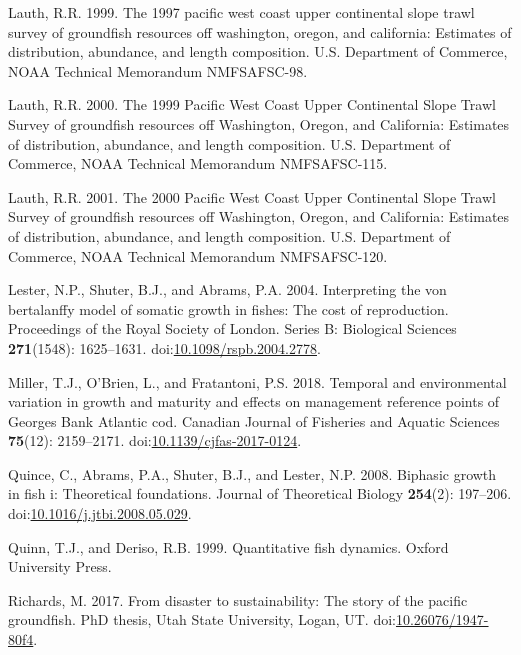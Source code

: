 \documentclass[
]{article}
\newlength{\cslhangindent}
\newlength{\cslentryspacingunit} %
\newenvironment{CSLReferences}[2] %
 {%
  \setlength{\parindent}{0pt}
  \ifodd #1
  \let\oldpar\par
  \def\par{\hangindent=\cslhangindent\oldpar}
  \fi
  \setlength{\parskip}{#2\cslentryspacingunit}
 }%
 {}
\begin{document}
\begin{CSLReferences}{1}{0}
\leavevmode{}%
Lauth, R.R. 1999. The 1997 pacific west coast upper continental slope
trawl survey of groundfish resources off washington, oregon, and
california: Estimates of distribution, abundance, and length
composition. {U.S. Department of Commerce, NOAA Technical Memorandum
NMFSAFSC-98}.

\leavevmode{}%
Lauth, R.R. 2000. {The 1999 Pacific West Coast Upper Continental Slope
Trawl Survey of groundfish resources off Washington, Oregon, and
California: Estimates of distribution, abundance, and length
composition}. {U.S. Department of Commerce, NOAA Technical Memorandum
NMFSAFSC-115}.

\leavevmode{}%
Lauth, R.R. 2001. {The 2000 Pacific West Coast Upper Continental Slope
Trawl Survey of groundfish resources off Washington, Oregon, and
California: Estimates of distribution, abundance, and length
composition}. {U.S. Department of Commerce, NOAA Technical Memorandum
NMFSAFSC-120}.

\leavevmode{}%
Lester, N.P., Shuter, B.J., and Abrams, P.A. 2004. Interpreting the von
bertalanffy model of somatic growth in fishes: The cost of reproduction.
Proceedings of the Royal Society of London. Series B: Biological
Sciences \textbf{271}(1548): 1625--1631.
doi:\href{https://doi.org/10.1098/rspb.2004.2778}{10.1098/rspb.2004.2778}.

\leavevmode{}%
Miller, T.J., O'Brien, L., and Fratantoni, P.S. 2018. Temporal and
environmental variation in growth and maturity and effects on management
reference points of {G}eorges {B}ank {A}tlantic cod. Canadian Journal of
Fisheries and Aquatic Sciences \textbf{75}(12): 2159--2171.
doi:\href{https://doi.org/10.1139/cjfas-2017-0124}{10.1139/cjfas-2017-0124}.

\leavevmode{}%
Quince, C., Abrams, P.A., Shuter, B.J., and Lester, N.P. 2008. Biphasic
growth in fish i: Theoretical foundations. Journal of Theoretical
Biology \textbf{254}(2): 197--206.
doi:\href{https://doi.org/10.1016/j.jtbi.2008.05.029}{10.1016/j.jtbi.2008.05.029}.

\leavevmode{}%
Quinn, T.J., and Deriso, R.B. 1999. Quantitative fish dynamics. Oxford
University Press.

\leavevmode{}%
Richards, M. 2017. From disaster to sustainability: The story of the
pacific groundfish. PhD thesis, Utah State University, Logan, UT.
doi:\href{https://doi.org/10.26076/1947-80f4}{10.26076/1947-80f4}.


\end{CSLReferences}
\end{document}
